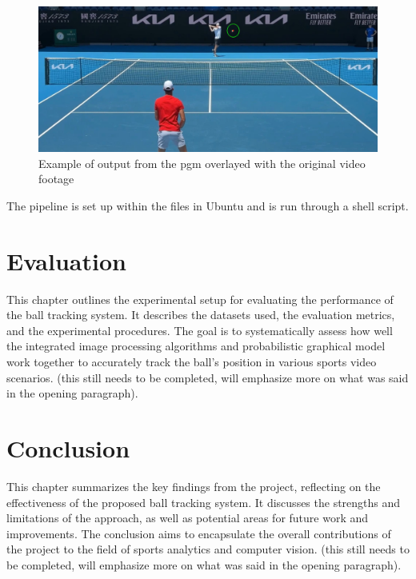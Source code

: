 \documentclass[12pt,a4paper]{article}
\begin{document}
\begin{figure}[H]
	\centering
	\includegraphics[width=\textwidth]{ZvsDOut.jpg}
	\caption{Example of output from the \acs{pgm} overlayed with the original video footage}
	\label{fig:output}
\end{figure}

The pipeline is set up within the files in Ubuntu and is run through a shell script.

\newpage
\section{Evaluation}
This chapter outlines the experimental setup for evaluating the performance of the ball tracking system. It describes the datasets used, the evaluation metrics, and the experimental procedures. The goal is to systematically assess how well the integrated image processing algorithms and probabilistic graphical model work together to accurately track the ball's position in various sports video scenarios. (this still needs to be completed, will emphasize more on what was said in the opening paragraph).

\newpage
\section{Conclusion}
This chapter summarizes the key findings from the project, reflecting on the effectiveness of the proposed ball tracking system. It discusses the strengths and limitations of the approach, as well as potential areas for future work and improvements. The conclusion aims to encapsulate the overall contributions of the project to the field of sports analytics and computer vision. (this still needs to be completed, will emphasize more on what was said in the opening paragraph).

\newpage
\printbibliography
\end{document}

